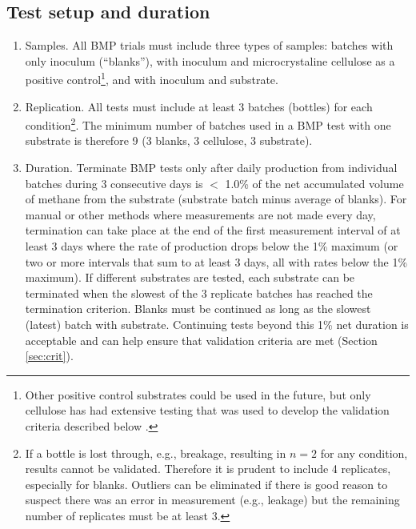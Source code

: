 \documentclass[]{article}
\begin{document}
\subsection{Test setup and duration}
\label{sec:setup}
\begin{enumerate}
  \item Samples. 
    All BMP trials must include three types of samples: batches with only inoculum (``blanks''), with inoculum and microcrystaline cellulose as a positive control\footnote{
      Other positive control substrates could be used in the future, but only cellulose has had extensive testing that was used to develop the validation criteria described below \cite{hafner_improving_nodate}.
    }, and with inoculum and substrate.
    \item Replication. 
    All tests must include at least 3 batches (bottles) for each condition\footnote{
      If a bottle is lost through, e.g., breakage, resulting in $n=2$ for any condition, results cannot be validated.
      Therefore it is prudent to include 4 replicates, especially for blanks.
      Outliers can be eliminated if there is good reason to suspect there was an error in measurement (e.g., leakage) but the remaining number of replicates must be at least 3.
    }.
    The minimum number of batches used in a BMP test with one substrate is therefore 9 (3 blanks, 3 cellulose, 3 substrate).
  \item Duration. 
    Terminate BMP tests only after daily  production from individual batches during 3 consecutive days is $<$ 1.0\% of the net accumulated volume of methane from the substrate (substrate batch minus average of blanks). 
    For manual or other methods where measurements are not made every day, termination can take place at the end of the first measurement interval of at least 3 days where the rate of production drops below the 1\% maximum (or two or more intervals that sum to at least 3 days, all with rates below the 1\% maximum).
    If different substrates are tested, each substrate can be terminated when the slowest of the 3 replicate batches has reached the termination criterion.
    Blanks must be continued as long as the slowest (latest) batch with substrate.
    Continuing tests beyond this 1\% net duration is acceptable and can help ensure that validation criteria are met (Section \ref{sec:crit}).
\end{enumerate}
\end{document}
